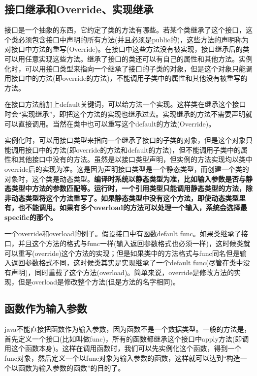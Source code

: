 \documentclass{article}
\begin{document}
	\subsection{接口继承和Override、实现继承}
	接口是一个抽象的东西，它约定了类的方法有哪些。若某个类继承了这个接口，这个类必须包含接口中声明的所有方法(并且必须是public的)，这些方法的声明称为对接口中方法的重写(Override)。在接口中这些方法没有被实现，接口继承后的类可以用任意实现这些方法。继承了接口的类还可以有自己的属性和其他方法。实例化时，可以用接口类型来指向一个继承了接口的子类的对象，但是这个对象只能调用接口中的方法(即override的方法)，不能调用子类中的属性和其他没有被重写的方法。
	
	在接口方法前加上default关键词，可以给方法一个实现。这样类在继承这个接口时会“实现继承”，即把这个方法的实现也继承过去。实现继承的方法不需要声明就可以直接调用。当然在类中也可以重写这个default的方法(Override)。
	
	实例化时，可以用接口类型来指向一个继承了接口的子类的对象，但是这个对象只能调用接口中的方法(即override的方法和default的方法)，但不能调用子类中的属性和其他接口中没有的方法。虽然是以接口类型声明，但实例的方法实现均以类中override后的实现为准。这是因为声明接口类型是一个静态类型，而创建一个类的对象时，这个类是动态类型。{\bfseries 编译时系统以静态类型为准，比如输入参数是否与静态类型中方法的参数匹配等。运行时，一个引用类型只能调用静态类型的方法，除非动态类型将这个方法重写了。如果静态类型中没有这个方法，即使动态类型里有，也不能调用。如果有多个overload的方法可以处理一个输入，系统会选择最specific的那个。}
	
	一个override和overload的例子。假设接口中有函数default func。如果类继承了接口，并且这个方法的格式与func一样(输入返回参数格式也必须一样)，这时候类就可以重写(override)这个方法的实现；但是如果类中的方法格式与func同名但是输入返回参数格式不同，这时候类其实是实现继承了一个default func(尽管在类中没有声明)，同时重载了这个方法(overload)。简单来说，override是修改方法的实现，但是overload是修改整个方法(但是方法的名字相同)。
	
	\subsection{函数作为输入参数}
	java不能直接把函数作为输入参数，因为函数不是一个数据类型。一般的方法是，首先定义一个接口(比如叫做func)，所有的函数都继承这个接口中apply方法(即调用这个函数本身)。这样在调用函数时，我们可以先实例化这个函数，得到一个func对象，然后定义一个以func对象为输入参数的函数，这样就可以达到“构造一个以函数为输入参数的函数”的目的了。
	
\end{document}
